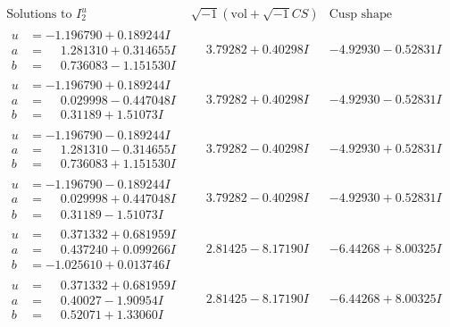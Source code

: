 \documentclass[1p]{elsarticle_modified}
\theoremstyle{definition}
\newcommand{\I}{\sqrt{-1}}
\begin{document}
$$\begin{array}{c|c|c}  
\text{Solutions to }I^u_{2}& \I (\text{vol} + \sqrt{-1}CS) & \text{Cusp shape}\\
 \hline 
\begin{aligned}
u &= -1.196790 + 0.189244 I \\
a &= \phantom{-}1.281310 + 0.314655 I \\
b &= \phantom{-}0.736083 - 1.151530 I\end{aligned}
 & \phantom{-}3.79282 + 0.40298 I & -4.92930 - 0.52831 I \\ \hline\begin{aligned}
u &= -1.196790 + 0.189244 I \\
a &= \phantom{-}0.029998 - 0.447048 I \\
b &= \phantom{-}0.31189 + 1.51073 I\end{aligned}
 & \phantom{-}3.79282 + 0.40298 I & -4.92930 - 0.52831 I \\ \hline\begin{aligned}
u &= -1.196790 - 0.189244 I \\
a &= \phantom{-}1.281310 - 0.314655 I \\
b &= \phantom{-}0.736083 + 1.151530 I\end{aligned}
 & \phantom{-}3.79282 - 0.40298 I & -4.92930 + 0.52831 I \\ \hline\begin{aligned}
u &= -1.196790 - 0.189244 I \\
a &= \phantom{-}0.029998 + 0.447048 I \\
b &= \phantom{-}0.31189 - 1.51073 I\end{aligned}
 & \phantom{-}3.79282 - 0.40298 I & -4.92930 + 0.52831 I \\ \hline\begin{aligned}
u &= \phantom{-}0.371332 + 0.681959 I \\
a &= \phantom{-}0.437240 + 0.099266 I \\
b &= -1.025610 + 0.013746 I\end{aligned}
 & \phantom{-}2.81425 - 8.17190 I & -6.44268 + 8.00325 I \\ \hline\begin{aligned}
u &= \phantom{-}0.371332 + 0.681959 I \\
a &= \phantom{-}0.40027 - 1.90954 I \\
b &= \phantom{-}0.52071 + 1.33060 I\end{aligned}
 & \phantom{-}2.81425 - 8.17190 I & -6.44268 + 8.00325 I \\ \hline\begin{aligned}

\end{aligned}
\end{array}$$
\end{document}
